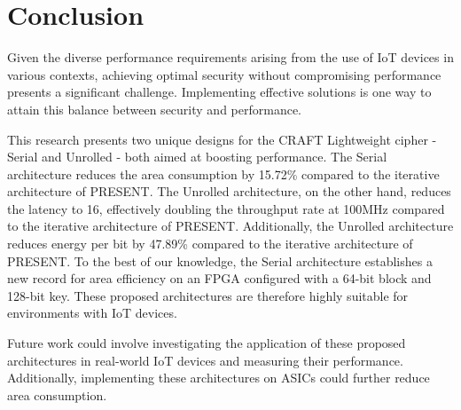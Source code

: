 \documentclass[final,5p,times,twocolumn]{elsarticle}
\begin{document}
\section{Conclusion}\label{sec6}

Given the diverse performance requirements arising from the use of IoT devices in various contexts, achieving optimal security without compromising performance presents a significant challenge. Implementing effective solutions is one way to attain this balance between security and performance.

This research presents two unique designs for the CRAFT Lightweight cipher - Serial and Unrolled - both aimed at boosting performance.
The Serial architecture reduces the area consumption by 15.72\% compared to the iterative architecture of PRESENT.
The Unrolled architecture, on the other hand, reduces the latency to 16, effectively doubling the throughput rate at 100MHz compared to the iterative architecture of PRESENT.
Additionally, the Unrolled architecture reduces energy per bit by 47.89\% compared to the iterative architecture of PRESENT.
To the best of our knowledge, the Serial architecture establishes a new record for area efficiency on an FPGA configured with a 64-bit block and 128-bit key. These proposed architectures are therefore highly suitable for environments with IoT devices.

Future work could involve investigating the application of these proposed architectures in real-world IoT devices and measuring their performance. Additionally, implementing these architectures on ASICs could further reduce area consumption.



\end{document}
